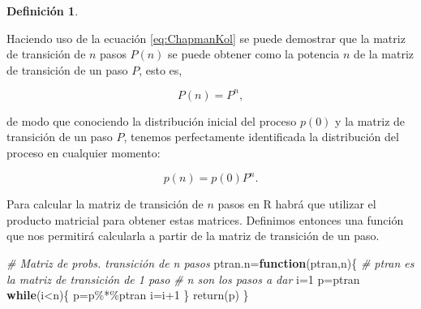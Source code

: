 \documentclass[
]{book}
\newenvironment{Shaded}{\begin{snugshade}}{\end{snugshade}}
\newcommand{\CommentTok}[1]{\textcolor[rgb]{0.56,0.35,0.01}{\textit{#1}}}
\newcommand{\ControlFlowTok}[1]{\textcolor[rgb]{0.13,0.29,0.53}{\textbf{#1}}}
\newcommand{\DecValTok}[1]{\textcolor[rgb]{0.00,0.00,0.81}{#1}}
\newcommand{\FunctionTok}[1]{\textcolor[rgb]{0.00,0.00,0.00}{#1}}
\newcommand{\NormalTok}[1]{#1}
\newcommand{\OtherTok}[1]{\textcolor[rgb]{0.56,0.35,0.01}{#1}}
\newcommand{\SpecialCharTok}[1]{\textcolor[rgb]{0.00,0.00,0.00}{#1}}
\newenvironment{yellowbox}{
  \definecolor{shadecolor}{rgb}{210, 180, 140}  
  \color{black}
  \begin{shaded}}
 {\end{shaded}}
\newenvironment{whitebox}{
  \definecolor{shadecolor}{rgb}{255, 255, 255}  
  \color{black}
  \begin{shaded}}
 {\end{shaded}}
\theoremstyle{definition}
\newtheorem{definition}{Definición}[chapter]
\theoremstyle{definition}
\theoremstyle{definition}
\theoremstyle{definition}
\theoremstyle{remark}
\begin{document}
\begin{yellowbox}

\begin{definition}
\protect\hypertarget{def:p-npasos}{}\label{def:p-npasos}

Haciendo uso de la ecuación \eqref{eq:ChapmanKol} se puede demostrar que la matriz de transición de \(n\) pasos \(P(n)\) se puede obtener como la potencia \(n\) de la matriz de transición de un paso \(P\), esto es,

\begin{equation}
P(n) = P^n,
\label{eq:matriznpasos}
\end{equation}

de modo que conociendo la distribución inicial del proceso \(p(0)\) y la matriz de transición de un paso \(P\), tenemos perfectamente identificada la distribución del proceso en cualquier momento:

\begin{equation}
p(n) = p(0)P^n.
\label{eq:distriproceso}
\end{equation}

\end{definition}

\end{yellowbox}

\begin{whitebox}

Para calcular la matriz de transición de \(n\) pasos en R habrá que utilizar el producto matricial para obtener estas matrices. Definimos entonces una función que nos permitirá calcularla a partir de la matriz de transición de un paso.

\begin{Shaded}
\begin{Highlighting}[]
\CommentTok{\# Matriz de probs. transición de n pasos}
\NormalTok{ptran.n}\OtherTok{=}\ControlFlowTok{function}\NormalTok{(ptran,n)\{}
  \CommentTok{\# ptran es la matriz de transición de 1 paso}
  \CommentTok{\# n son los pasos a dar}
\NormalTok{  i}\OtherTok{=}\DecValTok{1}
\NormalTok{  p}\OtherTok{=}\NormalTok{ptran}
  \ControlFlowTok{while}\NormalTok{(i}\SpecialCharTok{\textless{}}\NormalTok{n)\{}
\NormalTok{    p}\OtherTok{=}\NormalTok{p}\SpecialCharTok{\%*\%}\NormalTok{ptran}
\NormalTok{    i}\OtherTok{=}\NormalTok{i}\SpecialCharTok{+}\DecValTok{1}
\NormalTok{  \}}
\FunctionTok{return}\NormalTok{(p)  }
\NormalTok{\}}
\end{Highlighting}
\end{Shaded}

\end{whitebox}
\end{document}
